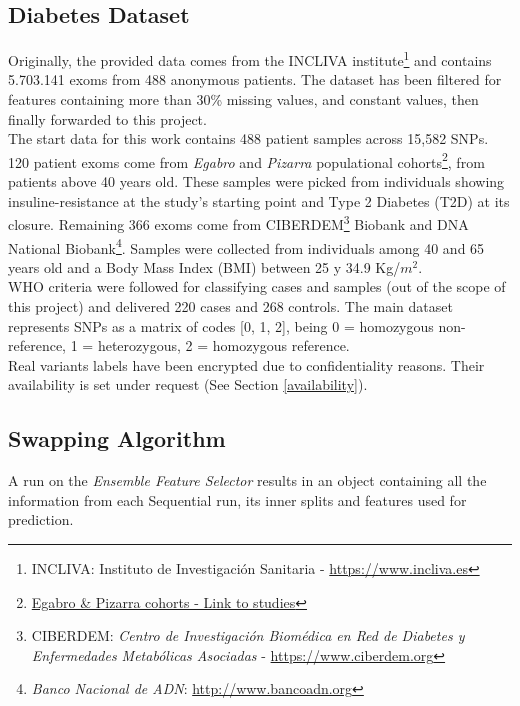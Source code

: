 \subsection{Diabetes Dataset}
Originally, the provided data comes from the INCLIVA institute\footnote{INCLIVA: Instituto de Investigación Sanitaria - \url{https://www.incliva.es}} and contains 5.703.141 exoms from 488 anonymous patients. The dataset has been filtered for features containing more than 30\% missing values, and constant values, then finally forwarded to this project.
\\

The start data for this work contains 488 patient samples across 15,582 SNPs. 120 patient exoms come from \emph{Egabro} and \emph{Pizarra} populational cohorts\footnote{\href{https://www.easd.org/virtualmeeting/home.html#!resources/prevention-of-type-2-diabetes-with-mediterranean-diet-preliminary-results-from-the-first-year-of-intervention-of-the-egabro-pizarra-study}{Egabro & Pizarra cohorts - Link to studies}}, from patients above 40 years old. These samples were picked from individuals showing insuline-resistance at the study's starting point and Type 2 Diabetes (T2D) at its closure. Remaining 366 exoms come from CIBERDEM\footnote{CIBERDEM: \emph{Centro de Investigación Biomédica en Red de Diabetes y Enfermedades Metabólicas Asociadas} - \url{https://www.ciberdem.org}} Biobank and DNA National Biobank\footnote{\emph{Banco Nacional de ADN}: \url{http://www.bancoadn.org}}. Samples were collected from individuals among 40 and 65 years old and a Body Mass Index (BMI) between 25 y 34.9 Kg/$m^{2}$.
\\

WHO criteria were followed for classifying cases and samples (out of the scope of this project) and delivered 220 cases and 268 controls. The main dataset represents SNPs as a matrix of codes [0, 1, 2], being 0 = homozygous non-reference, 1 = heterozygous, 2 = homozygous reference. 
\\

Real variants labels have been encrypted due to confidentiality reasons. Their availability is set under request (See Section \ref{availability}).


\subsection{Swapping Algorithm}
\label{section:methods:pipeline}
A run on the \emph{Ensemble Feature Selector} results in an object containing all the information from each Sequential run, its inner splits and features used for prediction.
\\

